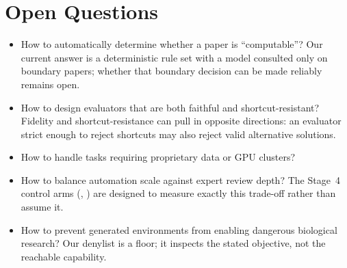 \section{Open Questions}

\begin{itemize}
  \item How to automatically determine whether a paper is ``computable''? Our
        current answer is a deterministic rule set with a model consulted only
        on boundary papers; whether that boundary decision can be made reliably
        remains open.
  \item How to design evaluators that are both faithful and shortcut-resistant?
        Fidelity and shortcut-resistance can pull in opposite directions: an
        evaluator strict enough to reject shortcuts may also reject valid
        alternative solutions.
  \item How to handle tasks requiring proprietary data or GPU clusters?
  \item How to balance automation scale against expert review depth? The
        Stage~4 control arms (, ) are designed to measure
        exactly this trade-off rather than assume it.
  \item How to prevent generated environments from enabling dangerous
        biological research? Our denylist is a floor; it inspects the stated
        objective, not the reachable capability.
\end{itemize}
